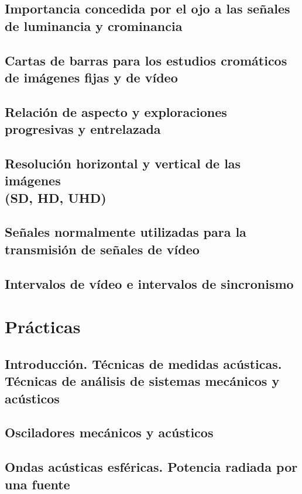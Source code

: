 \documentclass[a4paper]{book}
\begin{document}
\section{Importancia concedida por el ojo a las señales de luminancia y crominancia}
\section{Cartas de barras para los estudios cromáticos de imágenes fijas y de vídeo}
\section{Relación de aspecto y exploraciones progresivas y entrelazada}
\section[Resolución horizontal y vertical de las imágenes (SD, HD, UHD)]{Resolución horizontal y vertical de las imágenes\\ (SD, HD, UHD)}
\section{Señales normalmente utilizadas para la transmisión de señales de vídeo}
\section{Intervalos de vídeo e intervalos de sincronismo}

\appendix

\chapter{Prácticas}
\section[Introducción. Técnicas de medidas acústicas. Técnicas de análisis de sistemas mecánicos y acústicos]{Introducción. Técnicas de medidas acústicas.\\ Técnicas de análisis de sistemas mecánicos y acústicos}
\section{Osciladores mecánicos y acústicos}
\section{Ondas acústicas esféricas. Potencia radiada por una fuente}
\end{document}
